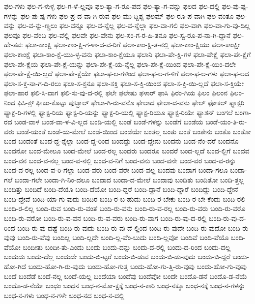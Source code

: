 {ಫಲ-ಗಳು
ಫಲ-ಗ-ಳುಳ್ಳ
ಫಲ-ಗ-ಳೆ-ಲ್ಲವೂ
ಫಲ-ತ್ಯಾ-ಗ-ರೂ-ಪದ
ಫಲ-ತ್ಯಾ-ಗ-ವನ್ನು
ಫಲದ
ಫಲ-ದಲ್ಲಿ
ಫಲ-ಪು-ಷ್ಪ-ಗಳನ್ನು
ಫಲ-ಪು-ಷ್ಪ-ಗಳು
ಫಲ-ಪ್ರ-ದ-ವಾ-ಗಿ-ರುವ
ಫಲ-ಮು-ದ್ದಿಶ್ಯ
ಫಲಮ್
ಫಲ-ರೂ-ಪ-ವಾಗಿ
ಫಲ-ವಂತೂ
ಫಲ-ವನ್ನು
ಫಲ-ವ-ನ್ನು-ಣ್ಣಲು
ಫಲ-ವನ್ನೂ
ಫಲ-ವ-ನ್ನೆಲ್ಲ
ಫಲ-ವ-ನ್ನೆಲ್ಲಾ
ಫಲ-ವಾ-ಗಲಿ
ಫಲ-ವಾಗಿ
ಫಲ-ವಾ-ಗು-ವು-ದಿಲ್ಲ
ಫಲವೂ
ಫಲ-ವೆಂಬ
ಫಲ-ವೆಲ್ಲಿ
ಫಲವೇ
ಫಲ-ವೇನು
ಫಲ-ಸಂ-ಗ-ರ-ಹಿ-ತನೂ
ಫಲ-ಸ್ವ-ರೂ-ಪ-ನಾ-ಗಿ-ದ್ದಾನೆ
ಫಲ-ಹೇ-ತವಃ
ಫಲಾ-ಕಾಂಕ್ಷಿ
ಫಲಾ-ಕಾಂ-ಕ್ಷಿ-ಗ-ಳಾ-ದ-ವ-ರಿಗೆ
ಫಲಾ-ಕಾಂ-ಕ್ಷಿ-ತ-ನಲ್ಲಿ
ಫಲಾ-ಕಾಂ-ಕ್ಷಿಯು
ಫಲಾ-ಕಾಂಕ್ಷೀ
ಫಲಾ-ಕಾಂಕ್ಷೆ
ಫಲಾ-ಕಾಂ-ಕ್ಷೆ-ಯು-ಳ್ಳ-ವನು
ಫಲಾ-ಕಾಂ-ಕ್ಷೆಯೂ
ಫಲಾನಿ
ಫಲಾ-ಪೇ-ಕ್ಷಿ-ಗಳ
ಫಲಾ-ಪೇಕ್ಷೆ
ಫಲಾ-ಪೇ-ಕ್ಷೆಗೆ
ಫಲಾ-ಪೇ-ಕ್ಷೆಯ
ಫಲಾ-ಪೇ-ಕ್ಷೆ-ಯನ್ನು
ಫಲಾ-ಪೇ-ಕ್ಷೆ-ಯ-ನ್ನೆಲ್ಲ
ಫಲಾ-ಪೇ-ಕ್ಷೆ-ಯಿಂದ
ಫಲಾ-ಪೇ-ಕ್ಷೆ-ಯಿಂ-ದಲೇ
ಫಲಾ-ಪೇ-ಕ್ಷೆ-ಯಿ-ಲ್ಲದೆ
ಫಲಾ-ಪೇ-ಕ್ಷೆಯೇ
ಫಲಾ-ಫ-ಲ-ಗಳಿಂದ
ಫಲಾ-ಫ-ಲ-ಗ-ಳಿಗೆ
ಫಲಾ-ಫ-ಲ-ಗಳು
ಫಲಾ-ಫ-ಲದ
ಫಲಾ-ಸ-ಕ್ತ-ನಾ-ಗ-ದಿ-ರಲು
ಫಲಾ-ಸ-ಕ್ತನೂ
ಫಲಾ-ಸಕ್ತಿ
ಫಲಾ-ಸ-ಕ್ತಿ-ಯಿಂದ
ಫಲಾ-ಸ-ಕ್ತಿ-ಯಿ-ಲ್ಲದೆ
ಫಲಾ-ಸ-ಕ್ತಿಯೇ
ಫಲಾ-ಹಾರ
ಫಲಿ-ಸಿ-ದಾಗ
ಫಲಿ-ಸು-ವು-ದ-ರಲ್ಲಿ
ಫಲೇ
ಫಲೇಷು
ಫಳಾರ್
ಫಾಸಿ
ಫಿರಂ-ಗಿಯ
ಫಿಲಂ
ಫಿಲಂನ
ಫಿಲಂ-ನಿಂದ
ಫಿಸಿ-ಕ್ಸ್
ಫೀಜು-ಕೊಟ್ಟು
ಫುಟ್ಬಾಲ್
ಫೇಲಾ-ಗಿ-ರು-ವನೊ
ಫೇಲಾದ
ಫೇಲಾ-ದ-ವನು
ಫೇಲ್
ಫೋಕಲ್
ಫ್ಯಾಕ್ಟರಿ
ಫ್ಯಾಕ್ಟ-ರಿ-ಗಳಲ್ಲಿ
ಫ್ಯಾಕ್ಟ-ರಿಯ
ಫ್ಯಾಕ್ಟ-ರಿ-ಯನ್ನು
ಫ್ಯಾಕ್ಟ-ರಿ-ಯಲ್ಲಿ
ಫ್ಯಾಕ್ಟ-ರಿಯೂ
ಫ್ಯಾಕ್ಟ-ರಿಯೇ
ಫ್ಯಾಶನ್
ಬಂಗಲೆ
ಬಂಗಾ-ರದ
ಬಂಡ-ವಾಳ
ಬಂಡ-ವಾ-ಳ-ವಿ-ಲ್ಲದ
ಬಂಡಿ-ಯಲ್ಲಿ
ಬಂಡೆ
ಬಂಡೆ-ಗಳನ್ನು
ಬಂಡೆಗೆ
ಬಂಡೆಯ
ಬಂಡೆ-ಯಂ-ತಿ-ರು-ವರು
ಬಂಡೆ-ಯಂತೆ
ಬಂಡೆ-ಯ-ಮೇಲೆ
ಬಂಡೆ-ಯಿಂದ
ಬಂಡೆಯೇ
ಬಂತಲ್ಲ
ಬಂತು
ಬಂತೆ
ಬಂತೇನು
ಬಂತೊ
ಬಂತೋ
ಬಂದ
ಬಂದಂತೆ
ಬಂದ-ದ್ದ-ನ್ನೆಲ್ಲಾ
ಬಂದ-ದ್ದ-ರಿಂದ
ಬಂದದ್ದು
ಬಂದ-ದ್ದೇನು
ಬಂದನು
ಬಂದ-ನೆಂ-ದರೆ
ಬಂದನೊ
ಬಂದನೋ
ಬಂದ-ಮೇಲೂ
ಬಂದ-ಮೇಲೆ
ಬಂದ-ರಲ್ಲ
ಬಂದರು
ಬಂದರೂ
ಬಂದರೆ
ಬಂದ-ಲ್ಲದೆ
ಬಂದ-ಲ್ಲಿಗೆ
ಬಂದವ
ಬಂದ-ವನ
ಬಂದ-ವ-ನಲ್ಲ
ಬಂದ-ವ-ನಲ್ಲಿ
ಬಂದ-ವ-ನಿಗೆ
ಬಂದ-ವನು
ಬಂದ-ವನೇ
ಬಂದ-ವರ
ಬಂದ-ವ-ರನ್ನು
ಬಂದ-ವ-ರಲ್ಲ
ಬಂದ-ವ-ರಿ-ಗೆಲ್ಲಾ
ಬಂದ-ವರು
ಬಂದ-ವರೇ
ಬಂದ-ವಲ್ಲ
ಬಂದವು
ಬಂದಾಗ
ಬಂದಾ-ಗಲೂ
ಬಂದಾ-ಗಲೆ
ಬಂದಾ-ಗಲೇ
ಬಂದಾ-ಗಿ-ನಿಂ-ದಲೂ
ಬಂದಾದ
ಬಂದಾ-ದ-ಮೇಲೆ
ಬಂದಾವು
ಬಂದಿತು
ಬಂದಿತೋ
ಬಂದಿ-ತ್ತಲ್ಲ
ಬಂದಿತ್ತು
ಬಂದಿದೆ
ಬಂದಿ-ದೆಯೊ
ಬಂದಿ-ದೆಯೋ
ಬಂದಿ-ದ್ದರೆ
ಬಂದಿ-ದ್ದಾನೆ
ಬಂದಿ-ದ್ದಾರೆ
ಬಂದಿದ್ದು
ಬಂದಿ-ದ್ದೇನೆ
ಬಂದಿ-ದ್ದೇವೆ
ಬಂದಿ-ಯಾ-ಗು-ವುದು
ಬಂದಿರ
ಬಂದಿ-ರ-ಬ-ಹುದು
ಬಂದಿ-ರ-ಬೇಕು
ಬಂದಿ-ರ-ಬೇ-ಕೆಂದು
ಬಂದಿ-ರಲಿ
ಬಂದಿ-ರ-ಲಿಲ್ಲ
ಬಂದಿ-ರುವ
ಬಂದಿ-ರು-ವಂತೆ
ಬಂದಿ-ರು-ವನು
ಬಂದಿ-ರು-ವ-ರಲ್ಲ
ಬಂದಿ-ರು-ವರು
ಬಂದಿ-ರು-ವರೊ
ಬಂದಿ-ರು-ವರೋ
ಬಂದಿ-ರು-ವ-ವನ
ಬಂದಿ-ರು-ವ-ವರು
ಬಂದಿ-ರು-ವಾಗ
ಬಂದಿ-ರು-ವು-ದ-ರಲ್ಲಿ
ಬಂದಿ-ರು-ವು-ದ-ರಿಂದ
ಬಂದಿ-ರು-ವು-ದಷ್ಟೆ
ಬಂದಿ-ರು-ವುದು
ಬಂದಿ-ರು-ವು-ದೆ-ಲ್ಲಿಂದ
ಬಂದಿ-ರು-ವುದೇ
ಬಂದಿ-ರು-ವುದೋ
ಬಂದಿ-ರು-ವುವು
ಬಂದಿ-ರು-ವೆವು
ಬಂದಿಲ್ಲ
ಬಂದಿ-ಲ್ಲದೇ
ಬಂದಿ-ಲ್ಲ-ವೆಂ-ಬುದು
ಬಂದಿ-ಲ್ಲವೋ
ಬಂದಿವೆ
ಬಂದಿ-ವೆಯೊ
ಬಂದಿ-ವೆಯೋ
ಬಂದೀತು
ಬಂದೀ-ತು-ಎಂದು
ಬಂದು
ಬಂದು-ದನ್ನು
ಬಂದು-ದ-ರಲ್ಲಿ
ಬಂದು-ದ-ರಿಂದ
ಬಂದು-ದಲ್ಲ
ಬಂದುದು
ಬಂದು-ದೆಲ್ಲ
ಬಂದುದೇ
ಬಂದು-ಬಿ-ಟ್ಟರೆ
ಬಂದು-ಬಿ-ಡುವ
ಬಂದು-ಬಿ-ಡು-ವುದು
ಬಂದು-ಬಿ-ದ್ದರೆ
ಬಂದು-ಹೋ-ಗಿದೆ
ಬಂದು-ಹೋ-ಗಿ-ರು-ವುದು
ಬಂದು-ಹೋ-ಗುತ್ತ
ಬಂದು-ಹೋ-ಗು-ತ್ತಿ-ರು-ವುವು
ಬಂದು-ಹೋ-ಗು-ವುವು
ಬಂದೆ
ಬಂದೆಡೆ
ಬಂದೆ-ನಲ್ಲ
ಬಂದೆ-ಯಲ್ಲ
ಬಂದೆಯಾ
ಬಂದೆವು
ಬಂದೆವೋ
ಬಂದೇ
ಬಂದೊ-ಡನೆ
ಬಂದೊ-ಡ-ನೆಯೆ
ಬಂದೊ-ಡ-ನೆಯೇ
ಬಂಧಂ
ಬಂಧನ
ಬಂಧ-ನ-ಮೋ-ಕ್ಷಕ್ಕೆ
ಬಂಧ-ನ-ಕಾರಿ
ಬಂಧ-ನಕ್ಕೂ
ಬಂಧ-ನಕ್ಕೆ
ಬಂಧ-ನ-ಗಳನ್ನು
ಬಂಧ-ನ-ಗಳು
ಬಂಧ-ನ-ಗಳೇ
ಬಂಧ-ನದ
ಬಂಧ-ನ-ದಲ್ಲಿ
}
